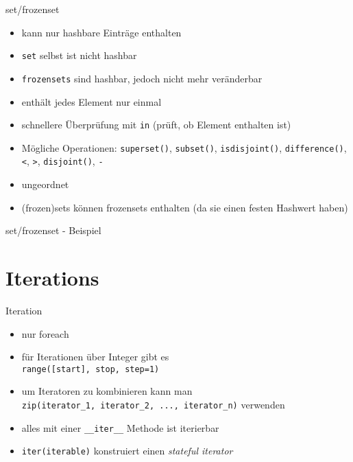 \begin{frame}{set/frozenset}
	\begin{itemize}
		\item kann nur hashbare Einträge enthalten
		\item \texttt{set} selbst ist nicht hashbar
		\item \texttt{frozensets} sind hashbar, jedoch nicht mehr veränderbar
		\item enthält jedes Element nur einmal
		\item schnellere Überprüfung mit \alert{\texttt{in}} (prüft, ob Element enthalten ist)
		\item Mögliche Operationen: \alert{\texttt{superset()}}, \alert{\texttt{subset()}}, \alert{\texttt{isdisjoint()}}, \alert{\texttt{difference()}}, \alert{\texttt{<}}, \alert{\texttt{>}}, \alert{\texttt{disjoint()}}, \alert{\texttt{-}}
		\item ungeordnet
		\item (frozen)sets können frozensets enthalten (da sie einen festen Hashwert haben)
	\end{itemize}
\end{frame}

\begin{frame}{set/frozenset - Beispiel}
	
\end{frame}


\section{Iterations}

\begin{frame}{Iteration}
	\begin{itemize}
		\item nur foreach
		\item für Iterationen über Integer gibt es \\ \hspace{0.5cm} \texttt{range([start], stop, step=1)}
		\item um Iteratoren zu kombinieren kann man \\ \hspace{0.5cm} \texttt{zip(iterator\_1, iterator\_2, ..., iterator\_n)} verwenden
		\item alles mit einer \alert{\texttt{\_\_iter\_\_}} Methode ist iterierbar
		\item \texttt{iter(iterable)} konstruiert einen \textit{stateful iterator}
	\end{itemize}
\end{frame}

